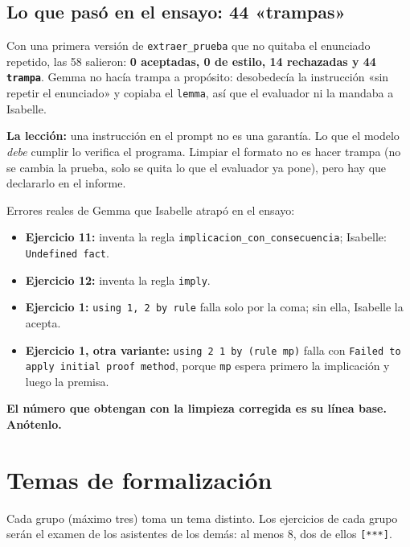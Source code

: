 \documentclass[11pt,a4paper]{article}
\newcommand{\cd}[1]{\texttt{\small #1}}
\begin{document}
\subsection{Lo que pasó en el ensayo: 44 «trampas»}
Con una primera versión de \cd{extraer\_prueba} que no quitaba el
enunciado repetido, las 58 salieron: \textbf{0 aceptadas, 0 de estilo, 14
rechazadas y 44 \cd{trampa}}. Gemma no hacía trampa a propósito:
desobedecía la instrucción «sin repetir el enunciado» y copiaba el
\cd{lemma}, así que el evaluador ni la mandaba a Isabelle.

\textbf{La lección:} una instrucción en el prompt no es una garantía. Lo
que el modelo \emph{debe} cumplir lo verifica el programa. Limpiar el
formato no es hacer trampa (no se cambia la prueba, solo se quita lo que
el evaluador ya pone), pero hay que declararlo en el informe.

Errores reales de Gemma que Isabelle atrapó en el ensayo:
\begin{itemize}
  \item \textbf{Ejercicio 11:} inventa la regla
    \cd{implicacion\_con\_consecuencia}; Isabelle: \cd{Undefined fact}.
  \item \textbf{Ejercicio 12:} inventa la regla \cd{imply}.
  \item \textbf{Ejercicio 1:} \cd{using 1, 2 by rule} falla solo por la
    coma; sin ella, Isabelle la acepta.
  \item \textbf{Ejercicio 1, otra variante:} \cd{using 2 1 by (rule mp)}
    falla con \cd{Failed to apply initial proof method}, porque \cd{mp}
    espera primero la implicación y luego la premisa.
\end{itemize}

\textbf{El número que obtengan con la limpieza corregida es su línea
base. Anótenlo.}

\section{Temas de formalización}

Cada grupo (máximo tres) toma un tema distinto. Los ejercicios de cada
grupo serán el examen de los asistentes de los demás: al menos 8, dos de
ellos \cd{[***]}.
\end{document}
